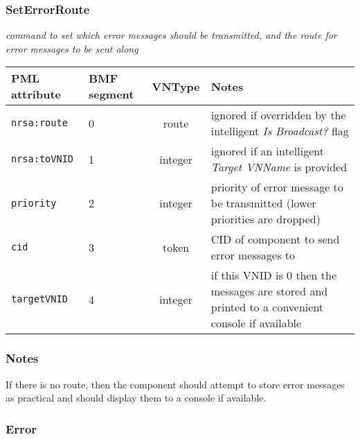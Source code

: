 \documentclass[pdftex,a4paper]{article}
\newcommand{\XMLfont}[1]{{\tt \small #1}}
\begin{document}
\clearpage

\subsubsection{SetErrorRoute}
{\em command to set which error messages should be transmitted, and the
route for error messages to be sent along}

\begin{table}[!h]
  \begin{center}
    \label{tab:SetErrorRoute}
    \begin{tabular}{|l|p{13mm}|c|p{60mm}|}
      \hline

      \textbf{PML attribute} & \textbf{BMF segment} & \textbf{VNType}
      & \textbf{Notes} \\\hline

      \XMLfont{nrsa:route} & 0 & route & ignored if overridden by the
      intelligent {\em Is Broadcast?} flag \\\hline

      \XMLfont{nrsa:toVNID} & 1 & integer & ignored if an intelligent
      {\em Target VNName} is provided \\\hline

      \XMLfont{priority} & 2 & integer & priority of error
      message to be transmitted (lower priorities are dropped)
      \\\hline

      \XMLfont{cid} & 3 & token & CID of component to send error
      messages to \\\hline

      \XMLfont{targetVNID} & 4 & integer & if this VNID is 0
      then the messages are stored and printed to a convenient console
      if available\\\hline

    \end{tabular}
  \end{center}
\end{table}

\subsubsection*{Notes}

If there is no route, then the component should attempt to store error
messages as practical and should display them to a console if
available.

\subsubsection{Error}
\end{document}
